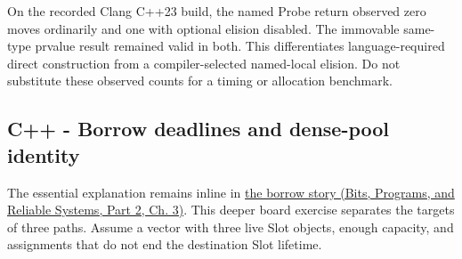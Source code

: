 On the recorded Clang C++23 build, the named Probe return observed zero moves ordinarily and one with optional elision disabled. The immovable same-type prvalue result remained valid in both. This differentiates language-required direct construction from a compiler-selected named-local elision. Do not substitute these observed counts for a timing or allocation benchmark.

\subsection{C++ - Borrow deadlines and dense-pool identity}\label{appendix-92ff77d4dfdc-c---borrow-deadlines-and-dense-pool-identity}

\hypertarget{appendix-92ff77d4dfdc-c---borrow-deadlines-and-dense-pool-identity}{}

The essential explanation remains inline in \href{../01-Bits-Programs-and-Reliable-Systems-P02/main.pdf\#nameddest=01-foundations-i-ch003-when-a-valid-borrow-stops-naming-the-intended-thing}{the borrow story (Bits, Programs, and Reliable Systems, Part 2, Ch. 3)}. This deeper board exercise separates the targets of three paths. Assume a vector with three live Slot objects, enough capacity, and assignments that do not end the destination Slot lifetime.

